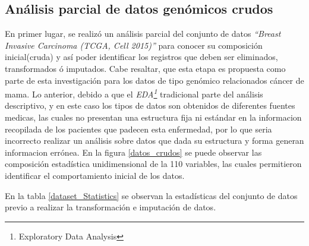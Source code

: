 \newpage
\subsection{Análisis parcial de datos genómicos crudos}
En primer lugar, se realizó un análisis parcial del conjunto de datos \textit{“Breast Invasive Carcinoma (TCGA, Cell 2015)”} para conocer su composición inicial(cruda) y así poder identificar los registros que deben ser eliminados, transformados ó imputados. Cabe resaltar, que esta etapa es propuesta como parte de esta investigación para los datos de tipo genómico relacionados cáncer de mama. Lo anterior, debido a que el \textit{EDA\footnote{Exploratory Data Analysis}} tradicional parte del análisis descriptivo, y en este caso los tipos de datos son obtenidos de diferentes fuentes medicas, las cuales no presentan una estructura fija ni estándar en la informacion recopilada de los pacientes que padecen esta enfermedad, por lo que seria incorrecto realizar un análisis sobre datos que dada su estructura y forma generan informacion errónea. En la figura \ref{datos_crudos} se puede observar las composición estadística unidimensional de la 110 variables, las cuales permitieron identificar el comportamiento inicial de los datos.

En la tabla \ref{dataset_Statistics} se observan la estadísticas del conjunto de datos previo a realizar la transformación e imputación de datos. 

